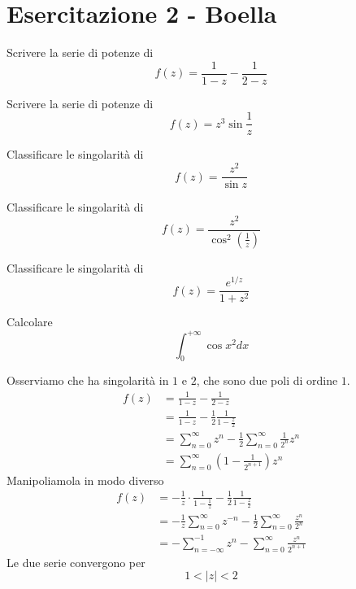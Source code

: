 \chapter{Esercitazione 2 - Boella}

\ParteEsercizi

\Esercizio{}

Scrivere la serie di potenze di
\begin{equation*}
f(z) = \frac{1}{1 - z} - \frac{1}{2 - z}
\end{equation*}

\Esercizio{}

Scrivere la serie di potenze di
\begin{equation*}
f(z) = z^{3}\sin\frac{1}{z}
\end{equation*}

\Esercizio{}

Classificare le singolarità di
\begin{equation*}
f(z) = \frac{z^{2}}{\sin z}
\end{equation*}

\Esercizio{}

Classificare le singolarità di
\begin{equation*}
f(z) = \frac{z^{2}}{\cos^{2}\left(\frac{1}{z}\right)}
\end{equation*}

\Esercizio{}

Classificare le singolarità di
\begin{equation*}
f(z) = \frac{e^{1/z}}{1 + z^{2}}
\end{equation*}


Calcolare
\begin{equation*}
\int^{+ \infty}_{0}\cos x^{2} dx
\end{equation*}

\ParteSoluzioni

\Soluzione

Osserviamo che ha singolarità in $1$ e $2$, che sono due poli di ordine $1$.
\begin{align*}
f(z) & = \frac{1}{1 - z} - \frac{1}{2 - z}\\
 & = \frac{1}{1 - z} - \frac{1}{2}\frac{1}{1 - \frac{z}{2}}\\
 & = \sum\limits^{\infty}_{n = 0} z^{n} - \frac{1}{2}\sum\limits^{\infty}_{n = 0}\frac{1}{2^{n}} z^{n}\\
 & = \sum\limits^{\infty}_{n = 0}\left(1 - \frac{1}{2^{n + 1}}\right) z^{n}
\end{align*}
Manipoliamola in modo diverso
\begin{align*}
f(z) & = - \frac{1}{z} \cdot \frac{1}{1 - \frac{1}{z}} - \frac{1}{2}\frac{1}{1 - \frac{z}{2}}\\
 & = - \frac{1}{z}\sum\limits^{\infty}_{n = 0} z^{- n} - \frac{1}{2}\sum\limits^{\infty}_{n = 0}\frac{z^{n}}{2^{n}}\\
 & = - \sum\limits^{- 1}_{n = -\infty} z^{n} - \sum\limits^{\infty}_{n = 0}\frac{z^{n}}{2^{n + 1}}
\end{align*}
Le due serie convergono per
\begin{equation*}
1 < \left| z\right| < 2
\end{equation*}

